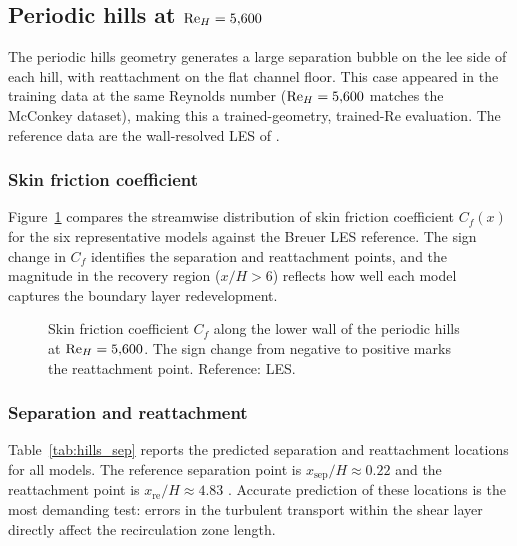 \subsection{Periodic hills at $\mathrm{Re}_H = 5{,}600$}
\label{sec:aposteriori:hills}

The periodic hills geometry generates a large separation bubble on the lee side of each hill, with reattachment on the flat channel floor.
This case appeared in the training data at the same Reynolds number ($\mathrm{Re}_H = 5{,}600$ matches the McConkey dataset), making this a trained-geometry, trained-Re evaluation.
The reference data are the wall-resolved LES of \citet{Breuer2009}.

\subsubsection{Skin friction coefficient}

Figure~\ref{fig:hills_cf} compares the streamwise distribution of skin friction coefficient $C_f(x)$ for the six representative models against the Breuer LES reference.
The sign change in $C_f$ identifies the separation and reattachment points, and the magnitude in the recovery region ($x/H > 6$) reflects how well each model captures the boundary layer redevelopment.

\begin{figure}[htbp]
\centering
{}
\caption{Skin friction coefficient $C_f$ along the lower wall of the periodic hills at $\mathrm{Re}_H = 5{,}600$. The sign change from negative to positive marks the reattachment point. Reference: \citet{Breuer2009} LES.}
\label{fig:hills_cf}
\end{figure}

\subsubsection{Separation and reattachment}

Table~\ref{tab:hills_sep} reports the predicted separation and reattachment locations for all models.
The reference separation point is $x_\mathrm{sep}/H \approx 0.22$ and the reattachment point is $x_\mathrm{re}/H \approx 4.83$ \citep{Breuer2009}.
Accurate prediction of these locations is the most demanding test: errors in the turbulent transport within the shear layer directly affect the recirculation zone length.


